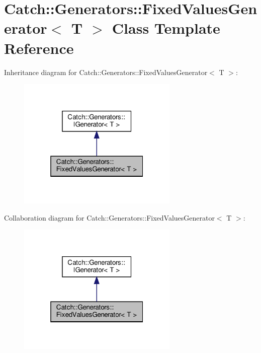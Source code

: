 \hypertarget{classCatch_1_1Generators_1_1FixedValuesGenerator}{}\section{Catch\+::Generators\+::Fixed\+Values\+Generator$<$ T $>$ Class Template Reference}
\label{classCatch_1_1Generators_1_1FixedValuesGenerator}


Inheritance diagram for Catch\+::Generators\+::Fixed\+Values\+Generator$<$ T $>$\+:\nopagebreak
\begin{figure}[H]
\begin{center}
\leavevmode
\includegraphics[width=217pt]{classCatch_1_1Generators_1_1FixedValuesGenerator__inherit__graph}
\end{center}
\end{figure}


Collaboration diagram for Catch\+::Generators\+::Fixed\+Values\+Generator$<$ T $>$\+:\nopagebreak
\begin{figure}[H]
\begin{center}
\leavevmode
\includegraphics[width=217pt]{classCatch_1_1Generators_1_1FixedValuesGenerator__coll__graph}
\end{center}
\end{figure}
